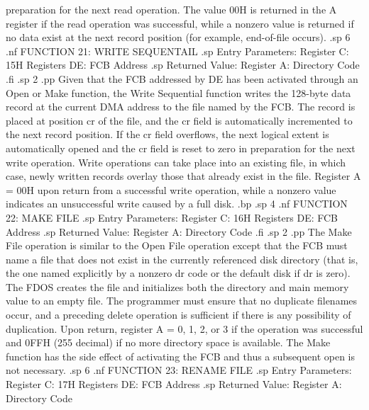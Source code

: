 preparation for the next read operation.  The value 00H is 
returned in the A register if the read operation was successful, 
while a nonzero value is returned if no data exist at the next 
record position (for example, end-of-file occurs).
.sp 6
.nf
                 FUNCTION 21:  WRITE SEQUENTAIL
.sp
               Entry Parameters:
                     Register C:  15H
                   Registers DE:  FCB Address
.sp
               Returned Value:
                    Register  A:  Directory Code
.fi
.sp 2
.pp
Given that the FCB addressed by DE has been activated through an 
Open or Make function, the Write Sequential 
function writes the 128-byte data record at the current DMA 
address to the file named by the FCB.  The record is placed at 
position cr of the file, and the cr field is automatically 
incremented to the next record position.  If the cr field 
overflows, the next logical extent is automatically opened and 
the cr field is reset to zero in preparation for the next write 
operation.  Write operations can take place into an existing 
file, in which case, newly written records overlay those that 
already exist in the file.  Register A = 00H upon return from a 
successful write operation, while a nonzero value indicates an 
unsuccessful write caused by a full disk.
.bp
.sp 4
.nf
                     FUNCTION 22:  MAKE FILE
.sp
                 Entry Parameters:
                       Register C:  16H
                     Registers DE:  FCB Address
.sp
                 Returned Value:
                      Register  A:  Directory Code
.fi
.sp 2
.pp
The Make File operation is similar to the Open File operation 
except that the FCB must name a file that does not exist in the 
currently referenced disk directory (that is, the one named 
explicitly by a nonzero dr code or the default disk if dr is 
zero).  The FDOS creates the file and initializes both the 
directory and main memory value to an empty file.  The programmer 
must ensure that no duplicate filenames occur, and a preceding 
delete operation is sufficient if there is any possibility of 
duplication.  Upon return, register A = 0, 1, 2, or 3 if the 
operation was successful and 0FFH (255 decimal) if no more 
directory space is available.  The Make function has the side 
effect of activating the FCB and thus a subsequent open is not 
necessary.
.sp 6
.nf
                    FUNCTION 23:  RENAME FILE
.sp
                Entry Parameters:
                      Register C:  17H
                    Registers DE:  FCB Address
.sp
                Returned Value:
                     Register  A:  Directory Code
